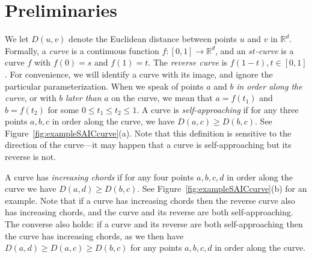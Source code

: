 \documentclass[11pt]{article}
\newcommand{\changed}[1]{#1}
\begin{document}
\section{Preliminaries}
We let $D(u,v)$ denote the Euclidean distance between points $u$ and $v$ in $\mathbb{R}^d$.
{\changed Formally, a
\emph{curve} is a continuous function $f\colon[0,1]\rightarrow \mathbb{R}^d$, and an $st$\emph{-curve} is a curve $f$ with $f(0)=s$ and $f(1)=t$.
The \emph{reverse curve} is $f(1-t), t \in [0,1]$.
For convenience, we will identify a curve with its image, and ignore the particular parameterization.  When we speak of points $a$ and $b$ \emph{in order along the curve}, or with $b$ \emph{later than} $a$ on the curve, we mean that $a=f(t_1)$ and $b=f(t_2)$ for some $0 \le t_1 \le t_2 \le 1$.
A curve is \emph{self-approaching} if for any three points $a,b,c$ in order along the curve, we have $D(a,c)\geq D(b,c)$. See Figure~\ref{fig:exampleSAICcurve}(a).
Note that this definition is sensitive to the direction of the curve---it may happen that a curve is self-approaching but its reverse is not.}

{\changed A curve has \emph{increasing chords} if for any four points $a,b,c,d$ in order along the curve we have $D(a,d) \ge D(b,c)$. See Figure~\ref{fig:exampleSAICcurve}(b) for an example.
Note that if a curve has increasing chords then the reverse curve also has increasing chords, and the curve and its reverse are both self-approaching.
The converse also holds: if a curve and its reverse are both self-approaching then the  curve has increasing chords, as we then have $D(a,d) \ge D(a,c) \ge D(b,c)$ for any points $a,b,c,d$ in order along the curve.}
\end{document}
